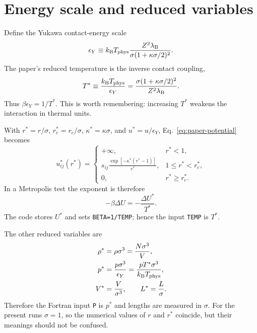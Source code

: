 \documentclass[11pt,a4paper]{article}
\newcommand{\code}[1]{\texttt{#1}}
\newcommand{\sgnq}{s_{ij}}
\begin{document}
\section{Energy scale and reduced variables}
Define the Yukawa contact-energy scale
\begin{equation}
 \epsilon_Y \equiv k_{\mathrm B}T_{\rm phys}
 \frac{Z^2\lambda_{\mathrm B}}
 {\sigma(1+\kappa\sigma/2)^2}.
\end{equation}
The paper's reduced temperature is the inverse contact coupling,
\begin{equation}
 T^* \equiv \frac{k_{\mathrm B}T_{\rm phys}}{\epsilon_Y}
 =\frac{\sigma(1+\kappa\sigma/2)^2}{Z^2\lambda_{\mathrm B}}.
 \label{eq:Tstar}
\end{equation}
Thus $\beta\epsilon_Y=1/T^*$.  This is worth remembering: increasing $T^*$
weakens the interaction in thermal units.

With $r^*=r/\sigma$, $r_c^*=r_c/\sigma$, $\kappa^*=\kappa\sigma$, and
$u^*=u/\epsilon_Y$, Eq.~\eqref{eq:paper-potential} becomes
\begin{equation}
u^*_{ij}(r^*)=
\begin{cases}
+\infty,&r^*<1,\\[1mm]
\displaystyle \sgnq\frac{\exp[-\kappa^*(r^*-1)]}{r^*},
&1\le r^*<r_c^*,\\[2mm]
0,&r^*\ge r_c^*.
\end{cases}
\label{eq:reduced-potential}
\end{equation}
In a Metropolis test the exponent is therefore
\begin{equation}
 -\beta\Delta U=-\frac{\Delta U^*}{T^*}.
\end{equation}
The code stores $U^*$ and sets \code{BETA=1/TEMP}; hence the input
\code{TEMP} is $T^*$.

The other reduced variables are
\begin{align}
 \rho^*&=\rho\sigma^3=\frac{N\sigma^3}{V},\\
 p^*&=\frac{p\sigma^3}{\epsilon_Y}
     =\frac{pT^*\sigma^3}{k_{\mathrm B}T_{\rm phys}},\\
 V^*&=\frac{V}{\sigma^3},\qquad L^*=\frac{L}{\sigma}.
\end{align}
Therefore the Fortran input \code{P} is $p^*$ and lengths are measured in
$\sigma$.  For the present runs $\sigma=1$, so the numerical values of $r$
and $r^*$ coincide, but their meanings should not be confused.
\end{document}
